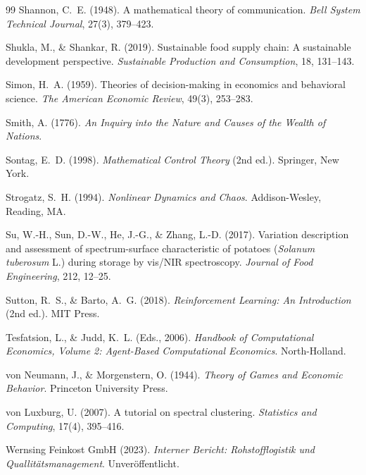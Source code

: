 \documentclass[a4paper, 12pt, twoside, openright]{report}
\theoremstyle{definition}
\theoremstyle{definition}
\begin{document}
\begin{thebibliography}{99}
Shannon, C.~E. (1948).
\newblock A mathematical theory of communication.
\newblock \emph{Bell System Technical Journal}, 27(3), 379--423.

Shukla, M., \& Shankar, R. (2019).
\newblock Sustainable food supply chain: A sustainable development perspective.
\newblock \emph{Sustainable Production and Consumption}, 18, 131--143.

Simon, H.~A. (1959).
\newblock Theories of decision-making in economics and behavioral science.
\newblock \emph{The American Economic Review}, 49(3), 253--283.

Smith, A. (1776).
\newblock \emph{An Inquiry into the Nature and Causes of the Wealth of Nations}.

Sontag, E.~D. (1998).
\newblock \emph{Mathematical Control Theory} (2nd ed.).
\newblock Springer, New York.

Strogatz, S.~H. (1994).
\newblock \emph{Nonlinear Dynamics and Chaos}.
\newblock Addison-Wesley, Reading, MA.

Su, W.-H., Sun, D.-W., He, J.-G., \& Zhang, L.-D. (2017).
\newblock Variation description and assessment of spectrum-surface characteristic of potatoes (\emph{Solanum tuberosum} L.) during storage by vis/NIR spectroscopy.
\newblock \emph{Journal of Food Engineering}, 212, 12--25.

Sutton, R.~S., \& Barto, A.~G. (2018).
\newblock \emph{Reinforcement Learning: An Introduction} (2nd ed.).
\newblock MIT Press.

Tesfatsion, L., \& Judd, K.~L. (Eds., 2006).
\newblock \emph{Handbook of Computational Economics, Volume 2: Agent-Based Computational Economics}.
\newblock North-Holland.

von Neumann, J., \& Morgenstern, O. (1944).
\newblock \emph{Theory of Games and Economic Behavior}.
\newblock Princeton University Press.

von Luxburg, U. (2007).
\newblock A tutorial on spectral clustering.
\newblock \emph{Statistics and Computing}, 17(4), 395--416.

Wernsing Feinkost GmbH (2023).
\newblock \emph{Interner Bericht: Rohstofflogistik und Quallit{\"a}tsmanagement}.
\newblock Unver{\"o}ffentlicht.


\end{thebibliography}
\end{document}
